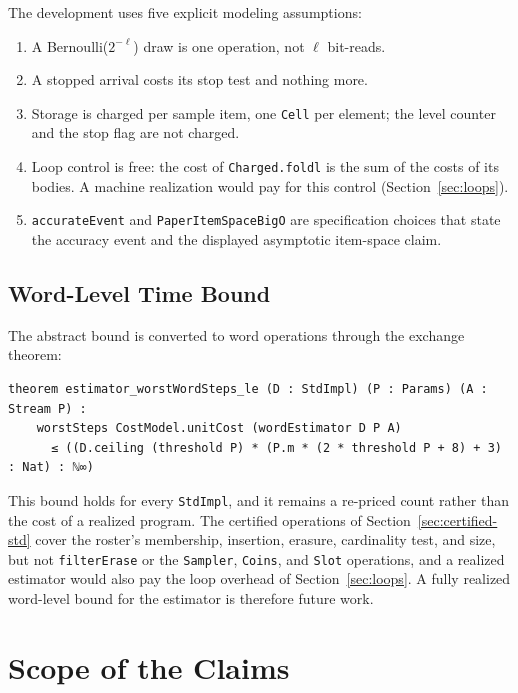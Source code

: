\documentclass[acmsmall,nonacm]{acmart}
\begin{document}
The development uses five explicit modeling assumptions:

\begin{enumerate}
  \item A Bernoulli($2^{-\ell}$) draw is one operation, not $\ell$ bit-reads.
  \item A stopped arrival costs its stop test and nothing more.
  \item Storage is charged per sample item, one \lstinline{Cell} per element; the level counter and the stop flag are not charged.
  \item Loop control is free: the cost of \lstinline{Charged.foldl} is the sum of the costs of its bodies. A machine realization would pay for this control (Section~\ref{sec:loops}).
  \item \lstinline{accurateEvent} and \lstinline{PaperItemSpaceBigO} are specification choices that state the accuracy event and the displayed asymptotic item-space claim.
\end{enumerate}

\subsection{Word-Level Time Bound}\label{sec:word-time}

The abstract bound is converted to word operations through the exchange theorem:

\begin{lstlisting}
theorem estimator_worstWordSteps_le (D : StdImpl) (P : Params) (A : Stream P) :
    worstSteps CostModel.unitCost (wordEstimator D P A)
      ≤ ((D.ceiling (threshold P) * (P.m * (2 * threshold P + 8) + 3) : Nat) : ℕ∞)
\end{lstlisting}

This bound holds for every \lstinline{StdImpl}, and it remains a re-priced count rather than the cost of a realized program.
The certified operations of Section~\ref{sec:certified-std} cover the roster's membership, insertion, erasure, cardinality test, and size, but not \lstinline{filterErase} or the \lstinline{Sampler}, \lstinline{Coins}, and \lstinline{Slot} operations, and a realized estimator would also pay the loop overhead of Section~\ref{sec:loops}.
A fully realized word-level bound for the estimator is therefore future work.


\section{Scope of the Claims}\label{sec:limitations}
\end{document}
